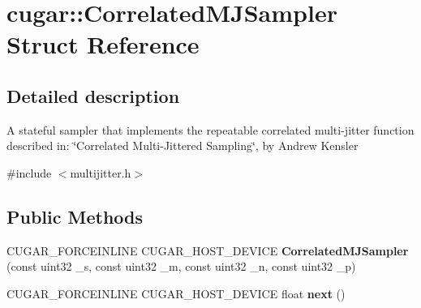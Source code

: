\hypertarget{structcugar_1_1_correlated_m_j_sampler}{}\section{cugar\+:\+:Correlated\+M\+J\+Sampler Struct Reference}
\label{structcugar_1_1_correlated_m_j_sampler}


\subsection{Detailed description}
A stateful sampler that implements the repeatable correlated multi-\/jitter function described in\+: \char`\"{}\+Correlated Multi-\/\+Jittered Sampling\char`\"{}, by Andrew Kensler 

{\ttfamily \#include $<$multijitter.\+h$>$}

\subsection*{Public Methods}
\begin{DoxyCompactItemize}
\item 
\mbox{\label{structcugar_1_1_correlated_m_j_sampler_a5d60343f2a554c5ab7b55a0b097dbb7d}} 
C\+U\+G\+A\+R\+\_\+\+F\+O\+R\+C\+E\+I\+N\+L\+I\+NE C\+U\+G\+A\+R\+\_\+\+H\+O\+S\+T\+\_\+\+D\+E\+V\+I\+CE {\bfseries Correlated\+M\+J\+Sampler} (const uint32 \+\_\+s, const uint32 \+\_\+m, const uint32 \+\_\+n, const uint32 \+\_\+p)
\item 
\mbox{\label{structcugar_1_1_correlated_m_j_sampler_af7ff039e80848d7f9e26420eff2a0193}} 
C\+U\+G\+A\+R\+\_\+\+F\+O\+R\+C\+E\+I\+N\+L\+I\+NE C\+U\+G\+A\+R\+\_\+\+H\+O\+S\+T\+\_\+\+D\+E\+V\+I\+CE float {\bfseries next} ()
\end{DoxyCompactItemize}
